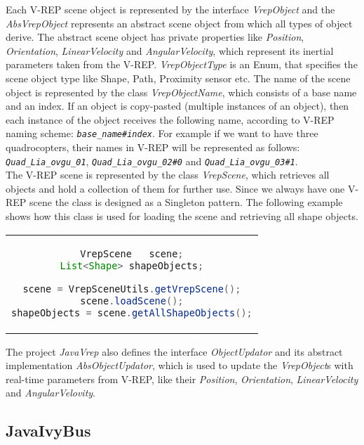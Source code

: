 Each V-REP scene object is represented by the interface \textit{VrepObject} and the \textit{AbsVrepObject} represents an abstract scene object from which all types of object derive. The abstract scene object has private properties like \textit{Position}, \textit{Orientation}, \textit{LinearVelocity} and \textit{AngularVelocity}, which represent its inertial parameters taken from the V-REP.
\textit{VrepObjectType} is an Enum, that specifies the scene object type like Shape, Path, Proximity sensor etc. The name of the scene object is represented by the class \textit{VrepObjectName}, which consists of a base name and an index. If an object is copy-pasted (multiple instances of an object), then
each instance of the object receives the following name, according to V-REP naming scheme: \textit{\texttt{base\_name\#index}}. For example if we want to have three quadrocopters, their names in V-REP will be represented as follows: \textit{\texttt{Quad\_Lia\_ovgu\_01}}, \textit{\texttt{Quad\_Lia\_ovgu\_02\#0}} and \textit{\texttt{Quad\_Lia\_ovgu\_03\#1}}. \\

The V-REP scene is represented by the class \textit{VrepScene}, which retrieves all objects and hold a collection of them for further use. Since we always have one V-REP scene the class is designed as a Singleton pattern. The following example shows how this class is used for loading the scene and retrieving all shape objects.

\begin{center}
\begin{tabular}{c}
\begin{lstlisting}[basicstyle=\small, language=Java]
VrepScene   scene;
List<Shape> shapeObjects;

scene = VrepSceneUtils.getVrepScene();
scene.loadScene();
shapeObjects = scene.getAllShapeObjects();

\end{lstlisting}
\end{tabular}
\end{center}

The project \textit{JavaVrep} also defines the interface \textit{ObjectUpdator} and its abstract implementation \textit{AbsObjectUpdator}, which is used to update the \textit{VrepObject}s with real-time parameters from V-REP, like their \textit{Position}, \textit{Orientation}, \textit{LinearVelocity} and \textit{AngularVelovity}.


\subsection{JavaIvyBus}
\label{sec:ivyBusImplementation}

